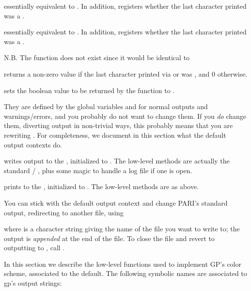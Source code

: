  essentially equivalent to
. In addition, registers whether the last character printed
was a .

 essentially equivalent to
. In addition, registers whether the last character printed
was a .



\noindent N.B. The function  does not exist since it would be
identical to 

 returns a non-zero value if the last
character printed via  or  was , and $0$ otherwise.

 sets the boolean value
to be returned by the function  to .

 They are defined by the global variables
 and  for normal outputs and warnings/errors, and you
probably do not want to change them. If you \emph{do} change them, diverting
output in non-trivial ways, this probably means that you are rewriting
. For completeness, we document in this section what the default
output contexts do.

 writes output to the  ,
initialized to .  The low-level methods are actually the standard
 / , plus some magic to handle a log file if one is
open.

 prints to the  , initialized
to . The low-level methods are as above.

You can stick with the default  output context and change PARI's
standard output, redirecting  to another file, using

 where  is a character string
giving the name of the file you want to write to; the output is
\emph{appended} at the end of the file. To close the file and revert to
outputting to , call .

In this section we describe the low-level functions used to implement GP's
color scheme, associated to the  default. The following symbolic
names are associated to gp's output strings:

